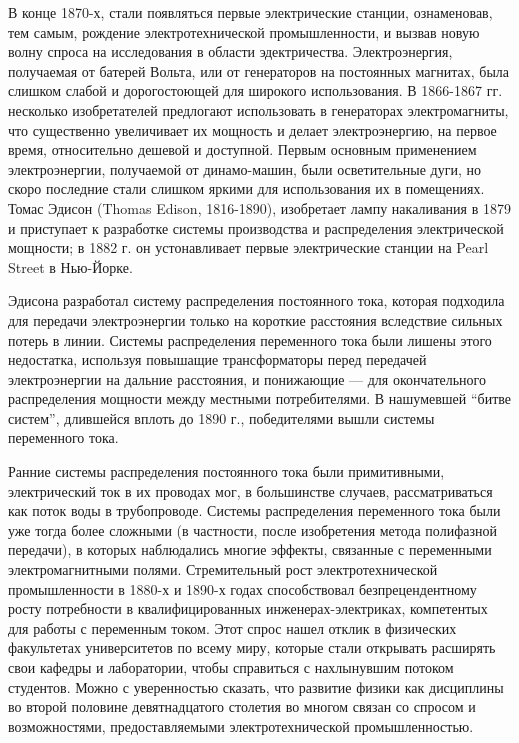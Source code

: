 \documentclass[12pt, oneside, a4paper]{article}
\begin{document}
В конце 1870-х, стали появляться первые электрические станции, ознаменовав, тем самым, рождение электротехнической промышленности, и вызвав новую волну спроса на исследования в области эдектричества. Электроэнергия, получаемая от батерей Вольта, или от генераторов на постоянных магнитах, была слишком слабой и дорогостоющей для широкого использования. В 1866-1867 гг. несколько изобретателей предлогают использовать в генераторах электромагниты, что существенно увеличивает их мощность и делает электроэнергию, на первое время, относительно дешевой и доступной. Первым основным применением электроэнергии, получаемой от динамо-машин, были осветительные дуги, но скоро последние стали слишком яркими для использования их в помещениях. Томас Эдисон (Thomas Edison, 1816-1890), изобретает лампу накаливания в 1879 и приступает к разработке системы производства и распределения электрической мощности; в 1882 г. он устонавливает первые электрические станции на Pearl Street в Нью-Йорке.

Эдисона разработал систему распределения постоянного тока, которая подходила для передачи электроэнергии только на короткие расстояния вследствие сильных потерь в линии. Системы распределения переменного тока были лишены этого недостатка, используя повышащие трансформаторы перед передачей электроэнергии на дальние расстояния, и понижающие --- для окончательного распределения мощности между местными потребителями. В нашумевшей ``битве систем'', длившейся вплоть до 1890 г., победителями вышли системы переменного тока.

Ранние системы распределения постоянного тока были примитивными, электрический ток в их проводах мог, в большинстве случаев, рассматриваться как поток воды в трубопроводе. Системы распределения переменного тока были уже тогда более сложными (в частности, после изобретения метода полифазной передачи), в которых наблюдались многие эффекты, связанные с переменными электромагнитными полями. Стремительный рост электротехнической промышленности в 1880-х и 1890-х годах способствовал безпрецендентному росту потребности в квалифицированных инженерах-электриках, компетентых для работы с переменным током. Этот спрос нашел отклик в физических факультетах университетов по всему миру, которые стали открывать расширять свои кафедры и лаборатории, чтобы справиться с нахлынувшим потоком студентов. Можно с уверенностью сказать, что развитие физики как дисциплины во второй половине девятнадцатого столетия во многом связан со спросом и возможностями, предоставляемыми электротехнической промышленностью. 
\end{document}
